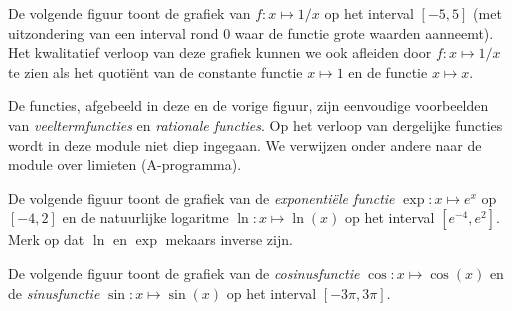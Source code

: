 De volgende figuur toont de grafiek van $f:x\mapsto 1/x$ op het
interval $[-5,5]$ (met uitzondering van een interval rond $0$ waar de
functie grote waarden aanneemt). Het kwalitatief verloop van deze
grafiek kunnen we ook afleiden door $f:x\mapsto 1/x$ te zien als het
quoti\"ent van de constante functie $x\mapsto 1$ en de functie
$x\mapsto x$.

\begin{center}
\end{center}

De functies, afgebeeld in deze en de vorige figuur, zijn eenvoudige
voorbeelden van {\em veeltermfuncties} en {\em rationale functies}. Op
het verloop van dergelijke functies wordt in deze module niet diep
ingegaan. We verwijzen onder andere naar de module over limieten
(A-programma).

De volgende figuur toont de grafiek van de {\em exponenti\"ele functie}
$\exp:x\mapsto e^x$ op $[-4,2]$ en de natuurlijke logaritme
$\ln:x\mapsto \ln(x)$ op het interval $[e^{-4},e^2]$. Merk op dat $\ln$ en
$\exp$ mekaars inverse zijn.

\begin{center}
\end{center}

De volgende figuur toont de grafiek van de {\em cosinusfunctie}
$\cos:x\mapsto \cos(x)$ en de {\em sinusfunctie} $\sin:x\mapsto \sin(x)$ op
het interval $[-3\pi,3\pi]$.

